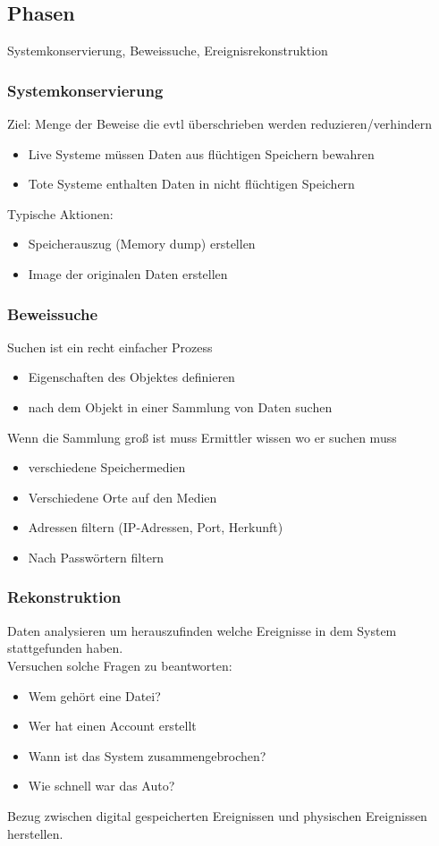 \documentclass{article} %
\begin{document}
\subsection{Phasen}
Systemkonservierung, Beweissuche, Ereignisrekonstruktion\\
\subsubsection{Systemkonservierung}
Ziel: Menge der Beweise die evtl überschrieben werden reduzieren/verhindern
\begin{itemize}
	\item Live Systeme müssen Daten aus flüchtigen Speichern bewahren
    \item Tote Systeme enthalten Daten in nicht flüchtigen Speichern
\end{itemize}
Typische Aktionen:
\begin{itemize}
	\item Speicherauszug (Memory dump) erstellen
    \item Image der originalen Daten erstellen
\end{itemize}
\subsubsection{Beweissuche}
Suchen ist ein recht einfacher Prozess
\begin{itemize}
	\item Eigenschaften des Objektes definieren
    \item nach dem Objekt in einer Sammlung von Daten suchen
\end{itemize}
Wenn die Sammlung groß ist muss Ermittler wissen wo er suchen muss
\begin{itemize}
	\item verschiedene Speichermedien
    \item Verschiedene Orte auf den Medien
    \item Adressen filtern (IP-Adressen, Port, Herkunft)
    \item Nach Passwörtern filtern
\end{itemize}

\subsubsection{Rekonstruktion}
Daten analysieren um herauszufinden welche Ereignisse in dem System stattgefunden haben.\\
Versuchen solche Fragen zu beantworten:
\begin{itemize}
	\item Wem gehört eine Datei?
    \item Wer hat einen Account erstellt
    \item Wann ist das System zusammengebrochen?
    \item Wie schnell war das Auto?
\end{itemize}
Bezug zwischen digital gespeicherten Ereignissen und physischen Ereignissen herstellen.
\end{document}
